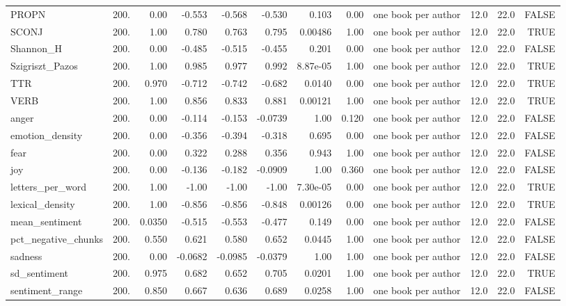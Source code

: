 \begin{table}[htbp]
\begin{tabular}{lrrrrrrrrrrr}
PROPN & 200. & 0.00 & -0.553 & -0.568 & -0.530 & 0.103 & 0.00 & one book per author & 12.0 & 22.0 & FALSE \\
SCONJ & 200. & 1.00 & 0.780 & 0.763 & 0.795 & 0.00486 & 1.00 & one book per author & 12.0 & 22.0 & TRUE \\
Shannon\_H & 200. & 0.00 & -0.485 & -0.515 & -0.455 & 0.201 & 0.00 & one book per author & 12.0 & 22.0 & FALSE \\
Szigriszt\_Pazos & 200. & 1.00 & 0.985 & 0.977 & 0.992 & 8.87e-05 & 1.00 & one book per author & 12.0 & 22.0 & TRUE \\
TTR & 200. & 0.970 & -0.712 & -0.742 & -0.682 & 0.0140 & 0.00 & one book per author & 12.0 & 22.0 & TRUE \\
VERB & 200. & 1.00 & 0.856 & 0.833 & 0.881 & 0.00121 & 1.00 & one book per author & 12.0 & 22.0 & TRUE \\
anger & 200. & 0.00 & -0.114 & -0.153 & -0.0739 & 1.00 & 0.120 & one book per author & 12.0 & 22.0 & FALSE \\
emotion\_density & 200. & 0.00 & -0.356 & -0.394 & -0.318 & 0.695 & 0.00 & one book per author & 12.0 & 22.0 & FALSE \\
fear & 200. & 0.00 & 0.322 & 0.288 & 0.356 & 0.943 & 1.00 & one book per author & 12.0 & 22.0 & FALSE \\
joy & 200. & 0.00 & -0.136 & -0.182 & -0.0909 & 1.00 & 0.360 & one book per author & 12.0 & 22.0 & FALSE \\
letters\_per\_word & 200. & 1.00 & -1.00 & -1.00 & -1.00 & 7.30e-05 & 0.00 & one book per author & 12.0 & 22.0 & TRUE \\
lexical\_density & 200. & 1.00 & -0.856 & -0.856 & -0.848 & 0.00126 & 0.00 & one book per author & 12.0 & 22.0 & TRUE \\
mean\_sentiment & 200. & 0.0350 & -0.515 & -0.553 & -0.477 & 0.149 & 0.00 & one book per author & 12.0 & 22.0 & FALSE \\
pct\_negative\_chunks & 200. & 0.550 & 0.621 & 0.580 & 0.652 & 0.0445 & 1.00 & one book per author & 12.0 & 22.0 & FALSE \\
sadness & 200. & 0.00 & -0.0682 & -0.0985 & -0.0379 & 1.00 & 1.00 & one book per author & 12.0 & 22.0 & FALSE \\
sd\_sentiment & 200. & 0.975 & 0.682 & 0.652 & 0.705 & 0.0201 & 1.00 & one book per author & 12.0 & 22.0 & TRUE \\
sentiment\_range & 200. & 0.850 & 0.667 & 0.636 & 0.689 & 0.0258 & 1.00 & one book per author & 12.0 & 22.0 & FALSE \\

\end{tabular}
\end{table}
